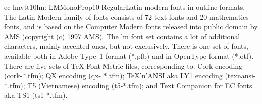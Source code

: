 \documentclass{ddltxtyp}
\begin{document}
\begin{package}{ec-lmvtt10}{lm: LMMonoProp10-Regular}{Latin modern fonts in outline formats.}
The Latin Modern family of fonts consists of 72 text fonts and
20 mathematics fonts, and is based on the Computer Modern fonts
released into public domain by AMS (copyright (c) 1997 AMS).
The lm font set contains a lot of additional characters, mainly
accented ones, but not exclusively. There is one set of fonts,
available both in Adobe Type~1 format (*.pfb) and in OpenType
format (*.otf). There are five sets of {\TeX} Font Metric files,
corresponding to: Cork encoding (cork-*.tfm); QX encoding (qx-
*.tfm); {\TeX}'n'ANSI aka LY1 encoding (texnansi-*.tfm); T5
(Vietnamese) encoding (t5-*.tfm); and Text Companion for EC
fonts aka TS1 (ts1-*.tfm).
\end{package}
\end{document}
